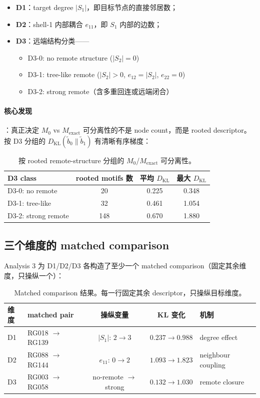 \documentclass[11pt,a4paper]{ctexart}
\begin{document}
\begin{itemize}
    \item \textbf{D1}：target degree $|S_1|$，即目标节点的直接邻居数；
    \item \textbf{D2}：shell-1 内部耦合 $e_{11}$，即 $S_1$ 内部的边数；
    \item \textbf{D3}：远端结构分类——
    \begin{itemize}
        \item D3-0: no remote structure ($|S_2|=0$)
        \item D3-1: tree-like remote ($|S_2|>0$, $e_{12}=|S_2|$, $e_{22}=0$)
        \item D3-2: strong remote（含多重回连或远端闭合）
    \end{itemize}
\end{itemize}

\paragraph{核心发现}：真正决定 $M_0$ vs $M_\mathrm{exact}$ 可分离性的不是 node count，而是 rooted descriptor。按 D3 分组的 $D_\mathrm{KL}(\tilde{b}_0\|\tilde{b}_1)$ 有清晰有序梯度：

\begin{table}[H]
\centering\small
\begin{tabular}{lccc}
\toprule
D3 class & rooted motifs 数 & 平均 $D_\mathrm{KL}$ & 最大 $D_\mathrm{KL}$ \\
\midrule
D3-0: no remote & 20 & 0.225 & 0.348 \\
D3-1: tree-like & 32 & 0.461 & 1.054 \\
D3-2: strong remote & 148 & 0.670 & 1.880 \\
\bottomrule
\end{tabular}
\caption{按 rooted remote-structure 分组的 $M_0$/$M_\mathrm{exact}$ 可分离性。}
\label{tab:d3_gradient}
\end{table}

\subsection{三个维度的 matched comparison}

Analysis 3 为 D1/D2/D3 各构造了至少一个 matched comparison（固定其余维度，只操纵一个）：

\begin{table}[H]
\centering\small
\begin{tabular}{llccl}
\toprule
维度 & matched pair & 操纵变量 & KL 变化 & 机制 \\
\midrule
D1 & RG018 $\to$ RG139 & $|S_1|$: $2\to 3$ & $0.237 \to 0.988$ & degree effect \\
D2 & RG088 $\to$ RG144 & $e_{11}$: $0\to 2$ & $1.093 \to 1.823$ & neighbour coupling \\
D3 & RG003 $\to$ RG058 & no-remote $\to$ strong & $0.132 \to 1.030$ & remote closure \\
\bottomrule
\end{tabular}
\caption{Matched comparison 结果。每一行固定其余 descriptor，只操纵目标维度。}
\end{table}
\end{document}

